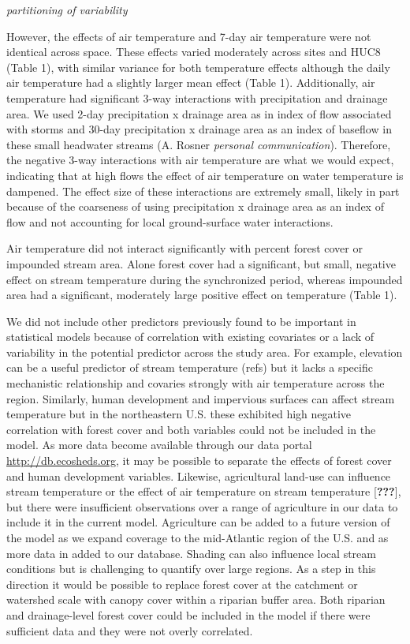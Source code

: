 \emph{partitioning of variability}

However, the effects of air temperature and 7-day air temperature were
not identical across space. These effects varied moderately across sites
and HUC8 (Table 1), with similar variance for both temperature effects
although the daily air temperature had a slightly larger mean effect
(Table 1). Additionally, air temperature had significant 3-way
interactions with precipitation and drainage area. We used 2-day
precipitation x drainage area as in index of flow associated with storms
and 30-day precipitation x drainage area as an index of baseflow in
these small headwater streams (A. Rosner \emph{personal communication}).
Therefore, the negative 3-way interactions with air temperature are what
we would expect, indicating that at high flows the effect of air
temperature on water temperature is dampened. The effect size of these
interactions are extremely small, likely in part because of the
coarseness of using precipitation x drainage area as an index of flow
and not accounting for local ground-surface water interactions.

Air temperature did not interact significantly with percent forest cover
or impounded stream area. Alone forest cover had a significant, but
small, negative effect on stream temperature during the synchronized
period, whereas impounded area had a significant, moderately large
positive effect on temperature (Table 1).

We did not include other predictors previously found to be important in
statistical models because of correlation with existing covariates or a
lack of variability in the potential predictor across the study area.
For example, elevation can be a useful predictor of stream temperature
(refs) but it lacks a specific mechanistic relationship and covaries
strongly with air temperature across the region. Similarly, human
development and impervious surfaces can affect stream temperature but in
the northeastern U.S. these exhibited high negative correlation with
forest cover and both variables could not be included in the model. As
more data become available through our data portal
\url{http://db.ecosheds.org}, it may be possible to separate the effects
of forest cover and human development variables. Likewise, agricultural
land-use can influence stream temperature or the effect of air
temperature on stream temperature {[}{\textbf{???}}{]}, but there were
insufficient observations over a range of agriculture in our data to
include it in the current model. Agriculture can be added to a future
version of the model as we expand coverage to the mid-Atlantic region of
the U.S. and as more data in added to our database. Shading can also
influence local stream conditions but is challenging to quantify over
large regions. As a step in this direction it would be possible to
replace forest cover at the catchment or watershed scale with canopy
cover within a riparian buffer area. Both riparian and drainage-level
forest cover could be included in the model if there were sufficient
data and they were not overly correlated.

